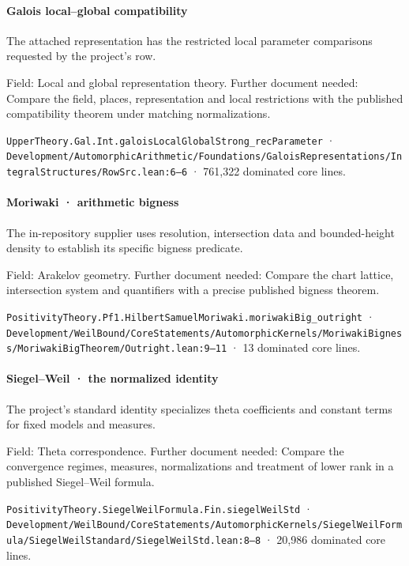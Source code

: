 \paragraph{Galois local–global compatibility}

The attached representation has the restricted local parameter comparisons requested by the project’s row.

Field: Local and global representation theory. Further document needed: Compare the field, places, representation and local restrictions with the published compatibility theorem under matching normalizations.

\nolinkurl{UpperTheory.Gal.Int.galoisLocalGlobalStrong_recParameter} · \nolinkurl{Development/AutomorphicArithmetic/Foundations/GaloisRepresentations/IntegralStructures/RowSrc.lean:6–6} · 761,322 dominated core lines.

\paragraph{Moriwaki · arithmetic bigness}

The in-repository supplier uses resolution, intersection data and bounded-height density to establish its specific bigness predicate.

Field: Arakelov geometry. Further document needed: Compare the chart lattice, intersection system and quantifiers with a precise published bigness theorem.

\nolinkurl{PositivityTheory.Pf1.HilbertSamuelMoriwaki.moriwakiBig_outright} · \nolinkurl{Development/WeilBound/CoreStatements/AutomorphicKernels/MoriwakiBigness/MoriwakiBigTheorem/Outright.lean:9–11} · 13 dominated core lines.

\paragraph{Siegel–Weil · the normalized identity}

The project’s standard identity specializes theta coefficients and constant terms for fixed models and measures.

Field: Theta correspondence. Further document needed: Compare the convergence regimes, measures, normalizations and treatment of lower rank in a published Siegel–Weil formula.

\nolinkurl{PositivityTheory.SiegelWeilFormula.Fin.siegelWeilStd} · \nolinkurl{Development/WeilBound/CoreStatements/AutomorphicKernels/SiegelWeilFormula/SiegelWeilStandard/SiegelWeilStd.lean:8–8} · 20,986 dominated core lines.

